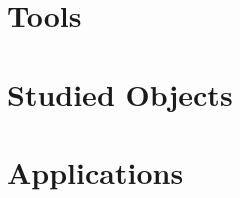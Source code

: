 \documentclass[a4paper,10pt]{book}
\theoremstyle{definition}
\begin{document}
 




\pagestyle{plain}  
\tableofcontents




\newpage
\pagestyle{fancy} 


\fancyhead{} %

\fancyhead[LE]{\slshape \rightmark}

\fancyhead[RO]{\slshape \leftmark}
\fancyfoot[C]{\thepage}
\renewcommand{\headrulewidth}{0.4pt}





\part{Tools}



\part{Studied Objects}


\part{Applications}







\pagestyle{plain}

 

\newpage


\end{document}
